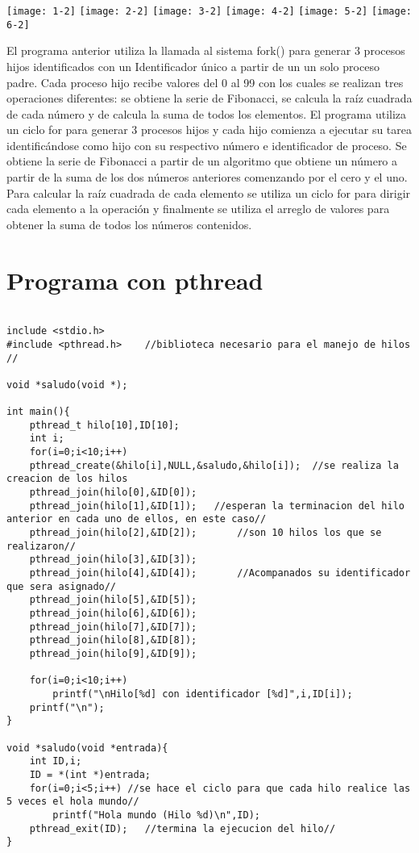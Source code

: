 \documentclass[12pt]{article} %
\begin{document}
\texttt{[image: 1-2]}
\texttt{[image: 2-2]}
\texttt{[image: 3-2]}
\texttt{[image: 4-2]}
\texttt{[image: 5-2]}
\texttt{[image: 6-2]}

El programa anterior utiliza la llamada al sistema fork() para generar 3 procesos hijos identificados con un Identificador único  a partir de un un solo proceso padre. Cada proceso hijo recibe valores del 0 al 99 con los cuales se realizan tres operaciones diferentes: se obtiene la serie de Fibonacci, se calcula la raíz cuadrada de cada número y de calcula la suma de todos los elementos.
El programa utiliza un ciclo for para generar 3 procesos hijos y cada hijo comienza a ejecutar su tarea identificándose como hijo con su respectivo número e identificador de proceso. Se obtiene la serie de Fibonacci a partir de un algoritmo que obtiene un número a partir de la suma de los dos números anteriores comenzando por el cero y el uno.
Para calcular la raíz cuadrada de cada elemento se utiliza un ciclo for para dirigir cada elemento a la operación y finalmente se utiliza el arreglo de valores para obtener la suma de todos los números contenidos.


\section{Programa con pthread}

\begin{lstlisting}

include <stdio.h>
#include <pthread.h>    //biblioteca necesario para el manejo de hilos //

void *saludo(void *);

int main(){
	pthread_t hilo[10],ID[10];										
	int i;												
	for(i=0;i<10;i++)
	pthread_create(&hilo[i],NULL,&saludo,&hilo[i]);	 //se realiza la creacion de los hilos					
	pthread_join(hilo[0],&ID[0]);								
	pthread_join(hilo[1],&ID[1]);	//esperan la terminacion del hilo anterior en cada uno de ellos, en este caso// 				
	pthread_join(hilo[2],&ID[2]);		//son 10 hilos los que se realizaron//						
	pthread_join(hilo[3],&ID[3]);					
	pthread_join(hilo[4],&ID[4]);		//Acompanados su identificador que sera asignado//				
	pthread_join(hilo[5],&ID[5]);					
	pthread_join(hilo[6],&ID[6]);								
	pthread_join(hilo[7],&ID[7]);					
	pthread_join(hilo[8],&ID[8]);								
	pthread_join(hilo[9],&ID[9]);
	
	for(i=0;i<10;i++)
		printf("\nHilo[%d] con identificador [%d]",i,ID[i]);
	printf("\n");
}

void *saludo(void *entrada){
	int ID,i;
	ID = *(int *)entrada;
	for(i=0;i<5;i++) //se hace el ciclo para que cada hilo realice las 5 veces el hola mundo//
		printf("Hola mundo (Hilo %d)\n",ID);
	pthread_exit(ID);	//termina la ejecucion del hilo//								
}


\end{lstlisting}
\end{document}

